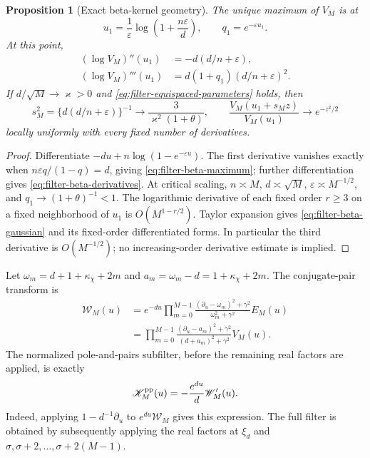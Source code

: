 \documentclass[11pt]{article}
\newtheorem{proposition}[theorem]{Proposition}
\theoremstyle{definition}
\theoremstyle{remark}
\begin{document}
\begin{proposition}[Exact beta-kernel geometry]
\label{prop:filter-beta-geometry}
The unique maximum of $V_M$ is at
\begin{equation}
 u_1=\frac1\varepsilon\log\left(1+\frac{n\varepsilon}{d}\right),
 \qquad q_1=e^{-\varepsilon u_1}.
 \label{eq:filter-beta-maximum}
\end{equation}
At this point,
\begin{equation}
 \begin{split}
 (\log V_M)''(u_1)&=-d(d/n+\varepsilon),\\
 (\log V_M)'''(u_1)&=d(1+q_1)(d/n+\varepsilon)^2.
 \end{split}
 \label{eq:filter-beta-derivatives}
\end{equation}
If $d/\sqrt M\to\varkappa>0$ and
\eqref{eq:filter-equispaced-parameters} holds, then
\begin{equation}
 s_M^2=\{d(d/n+\varepsilon)\}^{-1}
 \longrightarrow\frac{3}{\varkappa^2(1+\theta)},\qquad
 \frac{V_M(u_1+s_Mz)}{V_M(u_1)}\longrightarrow e^{-z^2/2}
 \label{eq:filter-beta-gaussian}
\end{equation}
locally uniformly with every fixed number of derivatives.
\end{proposition}

\begin{proof}
Differentiate $-du+n\log(1-e^{-\varepsilon u})$.
The first derivative vanishes exactly when
$n\varepsilon q/(1-q)=d$, giving \eqref{eq:filter-beta-maximum};
further differentiation gives \eqref{eq:filter-beta-derivatives}.
At critical scaling, $n\asymp M$, $d\asymp\sqrt M$,
$\varepsilon\asymp M^{-1/2}$, and $q_1\to(1+\theta)^{-1}<1$.
The logarithmic derivative of each fixed order $r\ge3$ on a fixed
neighborhood of $u_1$ is $O(M^{1-r/2})$.  Taylor expansion gives
\eqref{eq:filter-beta-gaussian} and its fixed-order differentiated
forms.  In particular the third derivative is $O(M^{-1/2})$;
no increasing-order derivative estimate is implied.
\end{proof}

Let $\omega_m=d+1+\kappa_\chi+2m$ and
$a_m=\omega_m-d=1+\kappa_\chi+2m$.  The conjugate-pair transform is
\begin{equation}
 \begin{split}
 \mathscr W_M(u)
 &=e^{-du}\prod_{m=0}^{M-1}
    \frac{(\partial_u-\omega_m)^2+\gamma^2}{\omega_m^2+\gamma^2}
           E_M(u)\\
 &=\prod_{m=0}^{M-1}
    \frac{(\partial_u-a_m)^2+\gamma^2}{(d+a_m)^2+\gamma^2}
           V_M(u).
 \end{split}
 \label{eq:filter-pair-beta-transform}
\end{equation}
The normalized pole-and-pairs subfilter, before the remaining real
factors are applied, is exactly
\begin{equation}
 \mathscr K_M^{\rm pp}(u)=-\frac{e^{du}}d\mathscr W_M'(u).
 \label{eq:filter-pole-pairs-derivative}
\end{equation}
Indeed, applying $1-d^{-1}\partial_u$ to
$e^{du}\mathscr W_M$ gives this expression.  The full filter is obtained
by subsequently applying the real factors at $\xi_d$ and
$\sigma,\sigma+2,\ldots,\sigma+2(M-1)$.
\end{document}
